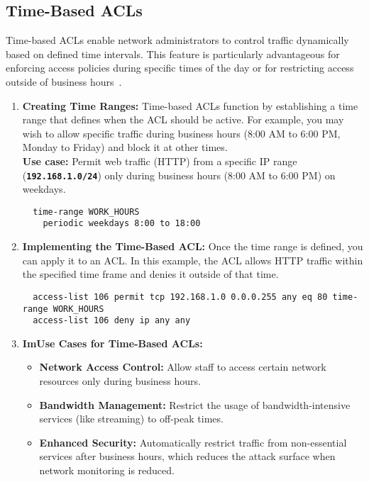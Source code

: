 \documentclass[11pt,a4paper]{article}
\begin{document}
    \subsection*{Time-Based ACLs}
        Time-based ACLs enable network administrators to control traffic dynamically based on defined time intervals. This feature is particularly advantageous for enforcing access policies during specific times of the day or for restricting access outside of business hours~\cite{Time-Based}.
            \begin{enumerate}
                \item \textbf{Creating Time Ranges:} Time-based ACLs function by establishing a time range that defines when the ACL should be active. For example, you may wish to allow specific traffic during business hours (8:00 AM to 6:00 PM, Monday to Friday) and block it at other times.
                \\[1em]
                \textbf{Use case:} Permit web traffic (HTTP) from a specific IP range (\textbf{\lstinline{192.168.1.0/24}}) only during business hours (8:00 AM to 6:00 PM) on weekdays.
\begin{lstlisting}
  time-range WORK_HOURS
    periodic weekdays 8:00 to 18:00                                                            
\end{lstlisting}
                \item \textbf{Implementing the Time-Based ACL:} Once the time range is defined, you can apply it to an ACL. In this example, the ACL allows HTTP traffic within the specified time frame and denies it outside of that time.
\begin{lstlisting}
  access-list 106 permit tcp 192.168.1.0 0.0.0.255 any eq 80 time-range WORK_HOURS
  access-list 106 deny ip any any                                                                              
\end{lstlisting}
                \item \textbf{ImUse Cases for Time-Based ACLs:}
                    \begin{itemize}
                        \item \textbf{Network Access Control:} Allow staff to access certain network resources only during business hours.

                        \item \textbf{Bandwidth Management:} Restrict the usage of bandwidth-intensive services (like streaming) to off-peak times.

                        \item \textbf{Enhanced Security:} Automatically restrict traffic from non-essential services after business hours, which reduces the attack surface when network monitoring is reduced.

                    \end{itemize}
            \end{enumerate}
\end{document}
